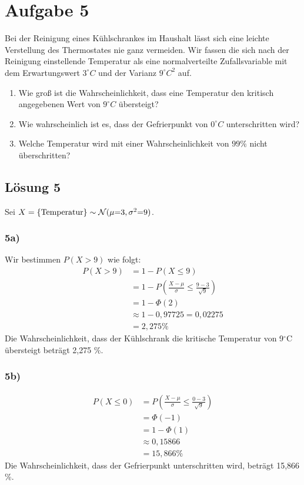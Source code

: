 \documentclass[main.tex]{subfiles}
\begin{document}
\section{Aufgabe 5}
Bei der Reinigung eines Kühlschrankes im Haushalt lässt sich eine leichte Verstellung des Thermostates nie ganz vermeiden. Wir fassen die sich nach der Reinigung einstellende Temperatur als eine normalverteilte Zufallsvariable mit dem Erwartungswert $3^{\circ}C$ und der Varianz $9^{\circ}C^2$ auf.
\begin{enumerate}
\item Wie groß ist die Wahrscheinlichkeit, dass eine Temperatur den kritisch angegebenen Wert von $9^{\circ}C$ übersteigt?
\item Wie wahrscheinlich ist es, dass der Gefrierpunkt von $0^{\circ}C$ unterschritten wird?
\item Welche Temperatur wird mit einer Wahrscheinlichkeit von $99\%$ nicht überschritten?
\end{enumerate}

\subsection{Lösung 5}
Sei $X = \{\text{Temperatur}\} \sim\mathcal{N}(\mu {=} 3, \sigma^2 {=} 9)$. 
\subsubsection{5a)}
Wir bestimmen $P(X{>}9)$ wie folgt:
$$\begin{aligned}
    P(X{>}9) &= 1 - P(X{\leq}9) \\
    &= 1 - P\left(\frac{X-\mu}{\sigma} \leq \frac{9-3}{\sqrt{9}}\right) \\
    &= 1 - \Phi(2) \\
    &\approx 1 - 0,97725 = 0,02275 \\
    &= 2,275 \%
\end{aligned}$$
Die Wahrscheinlichkeit, dass der Kühlschrank die kritische Temperatur von 9$^\circ$C übersteigt beträgt 2,275 \%.

\subsubsection{5b)}
$$\begin{aligned}
    P(X{\leq}0) &= P\left(\frac{X-\mu}{\sigma} \leq \frac{0-3}{\sqrt{9}}\right) \\
    &= \Phi(-1) \\
    &= 1 - \Phi(1) \\
    &\approx 0,15866 \\
    &= 15,866 \%
\end{aligned}$$
Die Wahrscheinlichkeit, dass der Gefrierpunkt unterschritten wird, beträgt 15,866 \%. 
\end{document}

